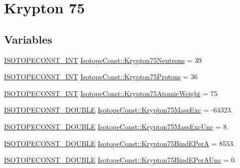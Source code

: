 \hypertarget{group___isotope_const-_krypton-_kr75}{}\section{Krypton 75}
\label{group___isotope_const-_krypton-_kr75}
\subsection*{Variables}
\begin{DoxyCompactItemize}
\item 
\mbox{\hyperlink{group___isotope_const-_macros_ga5f18360b3e99483a35c32d789e62621c}{I\+S\+O\+T\+O\+P\+E\+C\+O\+N\+S\+T\+\_\+\+I\+NT}} \mbox{\hyperlink{group___isotope_const-_krypton-_kr75_ga61bfbe85fb46f8e8a96bf9558651fda7}{Isotope\+Const\+::\+Krypton75\+Neutrons}} = 39
\item 
\mbox{\hyperlink{group___isotope_const-_macros_ga5f18360b3e99483a35c32d789e62621c}{I\+S\+O\+T\+O\+P\+E\+C\+O\+N\+S\+T\+\_\+\+I\+NT}} \mbox{\hyperlink{group___isotope_const-_krypton-_kr75_ga2b3321a279ae7b31506ace833fa28a56}{Isotope\+Const\+::\+Krypton75\+Protons}} = 36
\item 
\mbox{\hyperlink{group___isotope_const-_macros_ga5f18360b3e99483a35c32d789e62621c}{I\+S\+O\+T\+O\+P\+E\+C\+O\+N\+S\+T\+\_\+\+I\+NT}} \mbox{\hyperlink{group___isotope_const-_krypton-_kr75_ga8cf9d2189309d30b111969f8f804bf56}{Isotope\+Const\+::\+Krypton75\+Atomic\+Weight}} = 75
\item 
\mbox{\hyperlink{group___isotope_const-_macros_ga8f45a7272ce02c0b4c65c44636ed719a}{I\+S\+O\+T\+O\+P\+E\+C\+O\+N\+S\+T\+\_\+\+D\+O\+U\+B\+LE}} \mbox{\hyperlink{group___isotope_const-_krypton-_kr75_ga91bfe43103e22e92ef1f6cff28f8a32e}{Isotope\+Const\+::\+Krypton75\+Mass\+Exc}} = -\/64323.
\item 
\mbox{\hyperlink{group___isotope_const-_macros_ga8f45a7272ce02c0b4c65c44636ed719a}{I\+S\+O\+T\+O\+P\+E\+C\+O\+N\+S\+T\+\_\+\+D\+O\+U\+B\+LE}} \mbox{\hyperlink{group___isotope_const-_krypton-_kr75_ga328a21845885c16f3764b9394a933e75}{Isotope\+Const\+::\+Krypton75\+Mass\+Exc\+Unc}} = 8.
\item 
\mbox{\hyperlink{group___isotope_const-_macros_ga8f45a7272ce02c0b4c65c44636ed719a}{I\+S\+O\+T\+O\+P\+E\+C\+O\+N\+S\+T\+\_\+\+D\+O\+U\+B\+LE}} \mbox{\hyperlink{group___isotope_const-_krypton-_kr75_gab71bac619bea345bd518b203c610b5cd}{Isotope\+Const\+::\+Krypton75\+Bind\+E\+PerA}} = 8553.
\item 
\mbox{\hyperlink{group___isotope_const-_macros_ga8f45a7272ce02c0b4c65c44636ed719a}{I\+S\+O\+T\+O\+P\+E\+C\+O\+N\+S\+T\+\_\+\+D\+O\+U\+B\+LE}} \mbox{\hyperlink{group___isotope_const-_krypton-_kr75_gab11d77c92c1e170cd0a97ff25644e81f}{Isotope\+Const\+::\+Krypton75\+Bind\+E\+Per\+A\+Unc}} = 0.

\end{DoxyCompactItemize}
